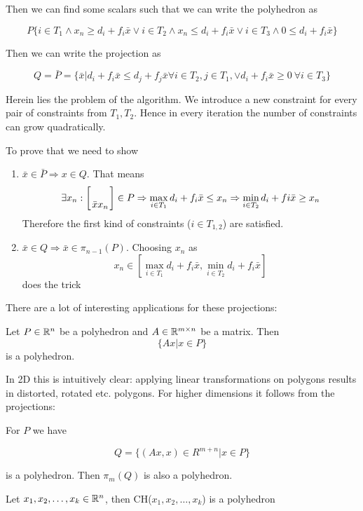 Then we can find some scalars such that we can write the polyhedron as

\[P \{i\in T_1 \wedge x_n \geq d_i + f_i \bar x \vee i\in T_2 \wedge x_n \leq d_i + f_i \bar x \vee i\in T_3 \wedge 0 \leq d_i + f_i \bar x\}\]

Then we can write the projection as 

\[Q = \bar P = \{\bar x | d_i+f_i\bar x \leq d_j+f_j\bar x \forall i\in T_2,j\in T_1, \vee d_i+f_i\bar x \geq 0\ \forall i\in T_3\}\]

Herein lies the problem of the algorithm. We introduce a new constraint for every pair of constraints from $T_1,T_2$. Hence in every iteration the number of constraints can grow quadratically.

\begin{pr} To prove that we need to show
\begin{enumerate}
\item $\bar x \in \bar P \Rightarrow x\in Q$. That means 
\[\exists x_n: \left[\atop{\bar x}{x_n}\right] \in P \Rightarrow \max_{i\in T_1} d_i +f_i \bar x \leq x_n \Rightarrow \min_{i\in T_2} d_i+fi\bar x \geq x_n\]
Therefore the first kind of constraints ($i \in T_{1,2}$) are satisfied.
\item $\bar x \in Q \Rightarrow \bar x \in \pi_{n-1}(P)$. Choosing $x_n$ as 
\[x_n \in [\max_{i\in T_1} d_i+f_i \bar x, \min_{i\in T_2} d_i+f_i \bar x]\]
does the trick
\end{enumerate}
\end{pr}

There are a lot of interesting applications for these projections:

\begin{thm} Let $P\in \mathbb{R}^n$ be a polyhedron and $A\in \mathbb{R}^{m\times n}$ be a matrix. Then 
\[\{Ax|x\in P\}\]
is a polyhedron.
\end{thm}

In 2D this is intuitively clear: applying linear transformations on polygons results in distorted, rotated etc. polygons. For higher dimensions it follows from the projections:

\begin{pr} For $P$ we have

\[Q=\{(Ax,x)\in R^{m+n}| x\in P\}\]

is a polyhedron. Then $\pi_m(Q)$ is also a polyhedron.
\end{pr}

\begin{cor} Let $x_1,x_2,\ldots, x_k \in \mathbb{R}^n$, then CH($x_1,x_2,\ldots, x_k$) is a polyhedron\end{cor}

